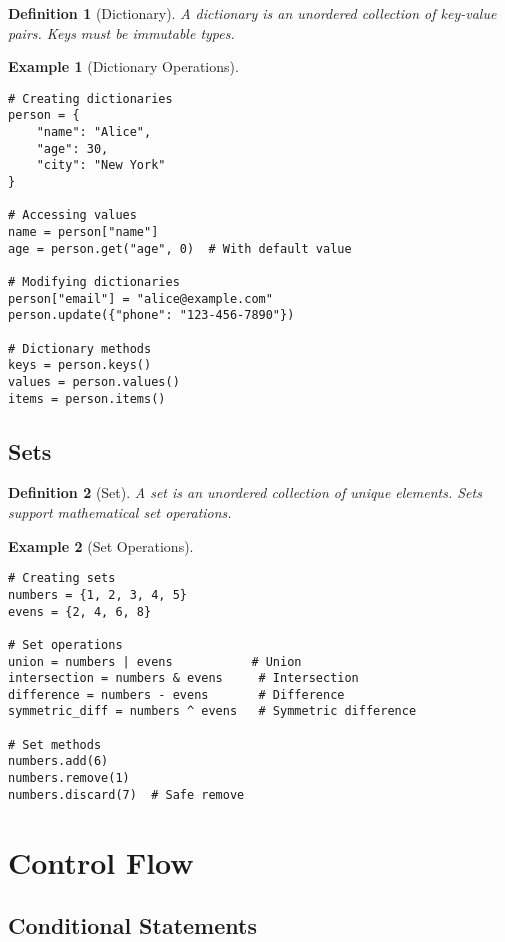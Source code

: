\documentclass[11pt]{article}
\newtheorem{definition}{Definition}[section]
\newtheorem{example}{Example}[section]
\begin{document}
\begin{definition}[Dictionary]
A dictionary is an unordered collection of key-value pairs. Keys must be immutable types.
\end{definition}

\begin{example}[Dictionary Operations]
\begin{lstlisting}
# Creating dictionaries
person = {
    "name": "Alice",
    "age": 30,
    "city": "New York"
}

# Accessing values
name = person["name"]
age = person.get("age", 0)  # With default value

# Modifying dictionaries
person["email"] = "alice@example.com"
person.update({"phone": "123-456-7890"})

# Dictionary methods
keys = person.keys()
values = person.values()
items = person.items()
\end{lstlisting}
\end{example}

\subsection{Sets}

\begin{definition}[Set]
A set is an unordered collection of unique elements. Sets support mathematical set operations.
\end{definition}

\begin{example}[Set Operations]
\begin{lstlisting}
# Creating sets
numbers = {1, 2, 3, 4, 5}
evens = {2, 4, 6, 8}

# Set operations
union = numbers | evens           # Union
intersection = numbers & evens     # Intersection
difference = numbers - evens       # Difference
symmetric_diff = numbers ^ evens   # Symmetric difference

# Set methods
numbers.add(6)
numbers.remove(1)
numbers.discard(7)  # Safe remove
\end{lstlisting}
\end{example}

\section{Control Flow}

\subsection{Conditional Statements}
\end{document}
